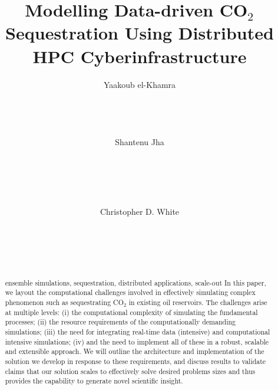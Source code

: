 \documentclass{acm_proc_article-sp}
\begin{document}
\title{Modelling Data-driven CO$_{2}$ Sequestration Using Distributed HPC Cyberinfrastructure}



\author{
\alignauthor
Yaakoub el-Khamra\\
       \\
       \\
       \\
       \\
\alignauthor
Shantenu Jha\\
       \\
       \\
       \\
       \\
       \\
\alignauthor
Christopher D. White\\
       \\
       \\
       \\
       \\
}

\maketitle

\begin{abstract}{ensemble simulations, sequestration, distributed
    applications, scale-out} In this paper, we layout the
  computational challenges involved in effectively simulating complex
  phenomenon such as sequestrating CO$_2$ in existing oil
  reservoirs. The challenges arise at multiple levels: (i) the
  computational complexity of simulating the fundamental processes;
  (ii) the resource requirements of the computationally demanding
  simulations; (iii) the need for integrating real-time data
  (intensive) and computational intensive simulations; (iv) and the
  need to implement all of these in a robust, scalable and extensible
  approach. We will outline the architecture and implementation of the
  solution we develop in response to these requirements, and discuss
  results to validate claims that our solution scales to effectively
  solve desired problems sizes and thus provides the capability to
  generate novel scientific insight.\end{abstract}
\end{document}
